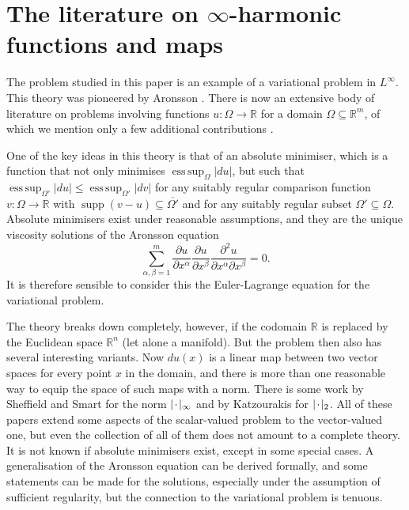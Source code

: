 \documentclass[10pt,a4paper]{amsart}
\newcommand{\R}{\mathbb{R}}
\DeclareMathOperator*{\esssup}{ess \, sup}
\DeclareMathOperator{\supp}{supp}
\newcommand{\blank}{{\mkern 2mu\cdot\mkern 2mu}}
\newcommand{\dd}[2]{\frac{\partial #1}{\partial #2}}
\begin{document}
\section{The literature on $\infty$-harmonic functions and maps}

The problem studied in this paper is an example of a variational problem in
$L^\infty$. This theory was pioneered by Aronsson \cite{Aronsson:65, Aronsson:66, Aronsson:67, Aronsson:68, Aronsson:84}. There is now an extensive body of
literature on problems involving functions $u \colon \Omega \to \R$
for a domain $\Omega \subseteq \R^m$, of which we mention only a few additional
contributions \cite{Bhattacharya-DiBenedetto-Manfredi:89, Jensen:93, Savin:05, Evans-Savin:08, Evans-Smart:11.2}.

One of the key ideas in this theory is that of an absolute minimiser, which
is a function that not only minimises $\esssup_{\Omega} |du|$, but such that
$\esssup_{\Omega'} |du| \le \esssup_{\Omega'} |dv|$ for any suitably regular comparison
function $v \colon \Omega \to \R$ with $\supp(v - u) \subseteq \overline{\Omega'}$ and
for any suitably regular subset $\Omega' \subseteq \Omega$.
Absolute minimisers exist under reasonable assumptions, and they are the unique
viscosity solutions of the Aronsson equation
\[
\sum_{\alpha, \beta = 1}^m \dd{u}{x^\alpha} \dd{u}{x^\beta} \frac{\partial^2 u}{\partial x^\alpha \partial x^\beta} = 0.
\]
It is therefore sensible to consider this the Euler-Lagrange equation for the
variational problem.

The theory breaks down completely, however, if the codomain $\R$ is replaced
by the Euclidean space $\R^n$ (let alone a manifold). But the problem then also
has several interesting variants. Now $du(x)$ is a linear map between two
vector spaces for every point $x$ in the domain, and there is more than one reasonable way to
equip the space of such maps with a norm. There is some work by
Sheffield and Smart \cite{Sheffield-Smart:12} for the norm $|\blank|_\infty$
and by Katzourakis \cite{Katzourakis:12, Katzourakis:13, Katzourakis:14.1, Katzourakis:14.2, Katzourakis:15.2, Katzourakis:17.1} for $|\blank|_2$.
All of these papers extend some aspects of the
scalar-valued problem to the vector-valued one, but even the collection of
all of them does not amount to a complete theory. It is not known if
absolute minimisers exist, except in some special cases. A generalisation of the Aronsson equation
can be derived formally, and some statements can be made for the solutions,
especially under the assumption of sufficient regularity, but the connection
to the variational problem is tenuous.
\end{document}
